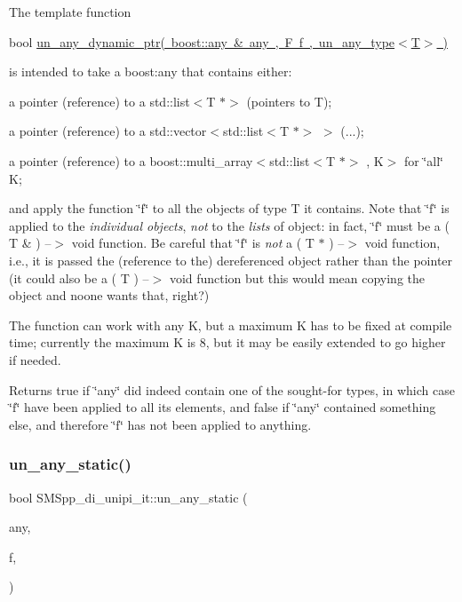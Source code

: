 The template function

bool \mbox{\hyperlink{group__boost__any__stuff_ga89921fc8079edf05986c4936cc6044e5}{un\+\_\+any\+\_\+dynamic\+\_\+ptr( boost\+::any \& any , F f , un\+\_\+any\+\_\+type$<$\+T$>$ )}}

is intended to take a boost\+:any that contains either\+:


\begin{DoxyItemize}
\item a pointer (reference) to a std\+::list$<$\+T $\ast$$>$ (pointers to T);
\item a pointer (reference) to a std\+::vector$<$std\+::list$<$\+T $\ast$$>$ $>$ (...);
\item a pointer (reference) to a boost\+::multi\+\_\+array$<$std\+::list$<$\+T $\ast$$>$ , K$>$ for \char`\"{}all\char`\"{} K;
\end{DoxyItemize}

and apply the function \char`\"{}f\char`\"{} to all the objects of type T it contains. Note that \char`\"{}f\char`\"{} is applied to the {\itshape individual objects}, {\itshape not} to the {\itshape lists} of object\+: in fact, \char`\"{}f\char`\"{} must be a ( T \& ) --$>$ void function. Be careful that \char`\"{}f\char`\"{} is {\itshape not} a ( T $\ast$ ) --$>$ void function, i.\+e., it is passed the (reference to the) dereferenced object rather than the pointer (it could also be a ( T ) --$>$ void function but this would mean copying the object and noone wants that, right?)

The function can work with any K, but a maximum K has to be fixed at compile time; currently the maximum K is 8, but it may be easily extended to go higher if needed.

Returns true if \char`\"{}any\char`\"{} did indeed contain one of the sought-\/for types, in which case \char`\"{}f\char`\"{} have been applied to all its elements, and false if \char`\"{}any\char`\"{} contained something else, and therefore \char`\"{}f\char`\"{} has not been applied to anything. \mbox{\label{group__boost__any__stuff_ga8ec1a694aa7a5fa58ab801c1ea419fa8}} 
\subsubsection{\texorpdfstring{un\+\_\+any\+\_\+static()}{un\_any\_static()}}
{\footnotesize\ttfamily bool S\+M\+Spp\+\_\+di\+\_\+unipi\+\_\+it\+::un\+\_\+any\+\_\+static (\begin{DoxyParamCaption}\item[{boost\+::any \&}]{any,  }\item[{F}]{f,  }\item[{\mbox{\hyperlink{struct_s_m_spp__di__unipi__it_1_1un__any__type}{un\+\_\+any\+\_\+type}}$<$ T $>$}]{ }\end{DoxyParamCaption})}

